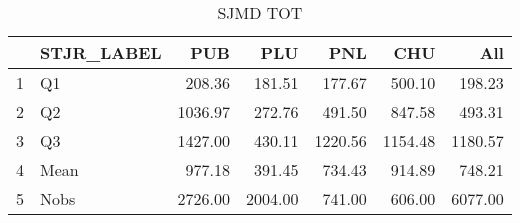 \begin{table}[ht]
\centering
\begin{tabular}{rlrrrrr}
  \hline
 & STJR\_LABEL & PUB & PLU & PNL & CHU & All \\ 
  \hline
1 & Q1 & 208.36 & 181.51 & 177.67 & 500.10 & 198.23 \\ 
  2 & Q2 & 1036.97 & 272.76 & 491.50 & 847.58 & 493.31 \\ 
  3 & Q3 & 1427.00 & 430.11 & 1220.56 & 1154.48 & 1180.57 \\ 
  4 & Mean & 977.18 & 391.45 & 734.43 & 914.89 & 748.21 \\ 
  5 & Nobs & 2726.00 & 2004.00 & 741.00 & 606.00 & 6077.00 \\ 
   \hline
\end{tabular}
\caption{SJMD TOT} 
\end{table}
